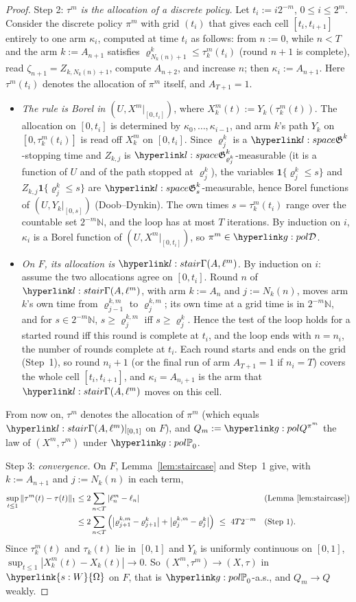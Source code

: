 \documentclass[11pt]{article}
\DeclareRobustCommand{\sy}[2]{{\hyperlink{#1}{#2}}}
\newcommand{\Nat}{\mathbb{N}}
\newcommand{\1}{\mathbf{1}}
\newcommand{\Om}{\sy{s:W}{\Omega}}
\begin{document}
\begin{proof}
Step 2: \emph{$\tau^m$ is the allocation of a discrete policy.} Let $t_i:=i2^{-m}$, $0\le i\le2^m$. Consider the discrete policy $\pi^m$ with grid $(t_i)$ that gives each
cell $[t_i,t_{i+1}]$ entirely to one arm $\kappa_i$, computed at time $t_i$ as follows: from $n:=0$, while $n<T$ and the arm $k:=A_{n+1}$ satisfies
$\varrho^k_{N_k(n)+1}\le\tau^m_k(t_i)$ (round $n+1$ is complete), read $\zeta_{n+1}=Z_{k,N_k(n)+1}$, compute $A_{n+2}$, and increase $n$; then $\kappa_i:=A_{n+1}$. Here
$\tau^m(t_i)$ denotes the allocation of $\pi^m$ itself, and $A_{T+1}=1$.
\begin{itemize}
\item \emph{The rule is Borel in $(U,X^m|_{[0,t_i]})$}, where $X^m_k(t):=Y_k(\tau^m_k(t))$. The allocation on $[0,t_i]$ is determined by $\kappa_0,\dots,\kappa_{i-1}$, and
arm $k$'s path $Y_k$ on $[0,\tau^m_k(t_i)]$ is read off $X^m_k$ on $[0,t_i]$. Since $\varrho^k_j$ is a $\lG^k$-stopping time and $Z_{k,j}$ is
$\lG^k_{\varrho^k_j}$-measurable (it is a function of $U$ and of the path stopped at $\varrho^k_j$), the variables $\1\{\varrho^k_j\le s\}$ and $Z_{k,j}\1\{\varrho^k_j\le s\}$
are $\lG^k_s$-measurable, hence Borel functions of $(U,Y_k|_{[0,s]})$ (Doob--Dynkin). The own times $s=\tau^m_k(t_i)$ range over the countable set $2^{-m}\Nat$, and the
loop has at most $T$ iterations. By induction on $i$, $\kappa_i$ is a Borel function of $(U,X^m|_{[0,t_i]})$, so $\pi^m\in\gDc$.
\item \emph{On $F$, its allocation is $\lGam(A,\ell^m)$.} By induction on $i$: assume the two allocations agree on $[0,t_i]$. Round $n$ of $\lGam(A,\ell^m)$, with arm $k:=A_n$
and $j:=N_k(n)$, moves arm $k$'s own time from $\varrho^{k,m}_{j-1}$ to $\varrho^{k,m}_j$; its own time at a grid time is in $2^{-m}\Nat$, and for $s\in2^{-m}\Nat$,
$s\ge\varrho^{k,m}_j$ iff $s\ge\varrho^k_j$. Hence the test of the loop holds for a started round iff this round is complete at $t_i$, and the loop ends with
$n=n_i$, the number of rounds complete at $t_i$. Each round starts and ends on the grid (Step~1), so round $n_i+1$ (or the final run of arm $A_{T+1}=1$ if
$n_i=T$) covers the whole cell $[t_i,t_{i+1}]$, and $\kappa_i=A_{n_i+1}$ is the arm that $\lGam(A,\ell^m)$ moves on this cell.
\end{itemize}
From now on, $\tau^m$ denotes the allocation of $\pi^m$ (which equals $\lGam(A,\ell^m)|_{[0,1]}$ on $F$), and $Q_m:=\gQp{\pi^m}$ the law of $(X^m,\tau^m)$ under $\gPh_0$.

Step 3: \emph{convergence.} On $F$, Lemma~\ref{lem:staircase} and Step~1 give, with $k:=A_{n+1}$ and $j:=N_k(n)$ in each term,
\begin{align*}
\sup_{t\le1}\|\tau^m(t)-\tau(t)\|_1&\le2\sum_{n<T}|\ell^m_n-\ell_n| &&\text{(Lemma~\ref{lem:staircase})}\\
&\le2\sum_{n<T}\Big(\big|\varrho^{k,m}_{j+1}-\varrho^k_{j+1}\big|+\big|\varrho^{k,m}_j-\varrho^k_j\big|\Big)\ \le\ 4T2^{-m} &&\text{(Step~1)}.
\end{align*}
Since $\tau^m_k(t)$ and $\tau_k(t)$ lie in $[0,1]$ and $Y_k$ is uniformly continuous on $[0,1]$, $\sup_{t\le1}|X^m_k(t)-X_k(t)|\to0$. So $(X^m,\tau^m)\to(X,\tau)$ in
$\Om$ on $F$, that is $\gPh_0$-a.s., and $Q_m\to Q$ weakly.


\end{proof}
\end{document}
